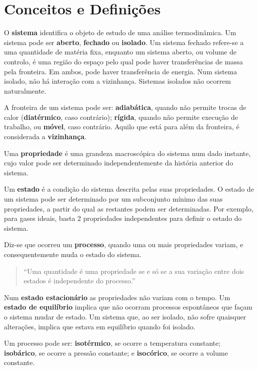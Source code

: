 \section{Conceitos e Definições}

O \textbf{sistema} identifica o objeto de estudo de uma análise termodinâmica. Um sistema pode ser \textbf{aberto}, \textbf{fechado} ou \textbf{isolado}. Um sistema fechado refere-se a uma quantidade de matéria fixa, enquanto um sistema aberto, ou volume de controlo, é uma região do espaço pelo qual pode haver transferências de massa pela fronteira. Em ambos, pode haver transferência de energia. Num sistema isolado, não há interação com a vizinhança. Sistemas isolados não ocorrem naturalmente.

A fronteira de um sistema pode ser: \textbf{adiabática}, quando não permite trocas de calor (\textbf{diatérmico}, caso contrário); \textbf{rígida}, quando não permite execução de trabalho, ou \textbf{móvel}, caso contrário. Aquilo que está para além da fronteira, é considerada a \textbf{vizinhança}.

Uma \textbf{propriedade} é uma grandeza macroscópica do sistema num dado instante, cujo valor pode ser determinado independentemente da história anterior do sistema.

Um \textbf{estado} é a condição do sistema descrita pelas suas propriedades. O estado de um sistema pode ser determinado por um subconjunto mínimo das suas propriedades, a partir do qual as restantes podem ser determinadas. Por exemplo, para gases ideais, basta 2 propriedades independentes para definir o estado do sistema.

Diz-se que ocorreu um \textbf{processo}, quando uma ou mais propriedades variam, e consequentemente muda o estado do sistema. 

\begin{quote}
    ``Uma quantidade é uma propriedade se e só se a sua variação entre dois estados é independente do processo.''
\end{quote}


Num \textbf{estado estacionário} as propriedades não variam com o tempo. Um \textbf{estado de equilíbrio} implica que não ocorram processos espontâneos que façam o sistema mudar de estado. Um sistema que, ao ser isolado, não sofre quaisquer alterações, implica que estava em equilíbrio quando foi isolado.

Um processo pode ser: \textbf{isotérmico}, se ocorre a temperatura constante; \textbf{isobárico}, se ocorre a pressão constante; e \textbf{isocórico}, se ocorre a volume constante.

